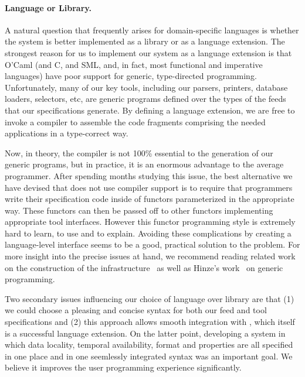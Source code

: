 \paragraph*{Language or Library.}
A natural question that frequently arises for domain-specific languages
is whether the system is better
implemented as a library or as a language extension.  The strongest reason
for us to implement our system as a language extension is that
O'Caml  (and C, and SML, and, in fact, most functional and imperative languages) 
have poor support for generic, type-directed programming.  Unfortunately, 
many of
our key tools, including our parsers, printers, database loaders, selectors,
etc, are generic programs defined over the types of the feeds that our 
specifications
generate.  By defining a language extension, we are free to invoke a
compiler to assemble the code fragments comprising the needed applications
in a type-correct way.  

Now, in theory, the compiler is not 100\% essential to the generation of
our generic programs, but in practice, it is an enormous advantage to the 
average programmer.  
After spending months studying this issue, the best alternative we have devised
that does not use compiler support is to require that
programmers write their specification code inside of functors parameterized
in the appropriate way.  These functors can then be passed off to other 
functors implementing appropriate tool interfaces.  However this 
functor programming style is extremely hard to learn, to use and to 
explain.
Avoiding these
complications by creating a language-level interface seems to be a good,
practical solution to the problem.  For more insight into the precise
issues at hand, we recommend reading related work on the construction of
the \padsml{} infrastructure~\cite{padsml-padl} 
as well as
Hinze's work~\cite{hinz:icfp04} on 
generic programming.

Two secondary issues influencing our choice of language over library
are that (1) we could choose a pleasing and concise syntax for both
our feed and tool specifications and (2) this approach allows
smooth integration with \padsml{}, which itself is a successful 
language extension.  On the latter point, developing a system in which
data locality, temporal availability, format and properties are
all specified in one place and in one seemlessly integrated syntax was
an important goal.  We believe it improves the user programming
experience significantly.

